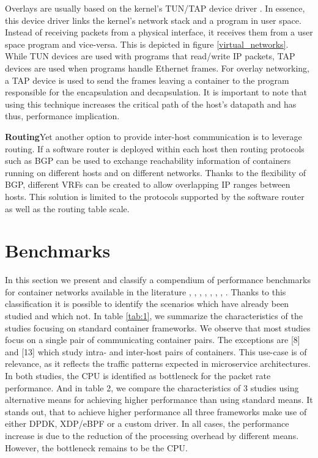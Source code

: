 \documentclass[conference]{IEEEtran}
\begin{document}
Overlays are usually based on the kernel's TUN/TAP device driver \cite{tuntap}. In essence, this device driver links the kernel's network stack and a program in user space. Instead of receiving packets from a physical interface, it receives them from a user space program and vice-versa. This is depicted in figure \ref{virtual_networks}. While TUN devices are used with programs that read/write IP packets, TAP devices are used when programs handle Ethernet frames. For overlay networking, a TAP device is used to send the frames leaving a container to the program responsible for the encapsulation and decapsulation. It is important to note that using this technique increases the critical path of the host's datapath and has thus, performance implication.

\noindent\textbf{Routing}\hspace{0.2cm}Yet another option to provide inter-host communication is to leverage routing. If a software router is deployed within each host then routing protocols such as BGP can be used to exchange reachability information of containers running on different hosts and on different networks. Thanks to the flexibility of BGP, different VRFs can be created to allow overlapping IP ranges between hosts. This solution is limited to the protocols supported by the software router as well as the routing table scale.

\section{Benchmarks}
In this section we present and classify a compendium of performance benchmarks for container networks available in the literature 
\cite{IEEE_INFOCOM_2018:K. Suo}, \cite{HotConNet_17:Zhao}, \cite{Nakamura:2018}, \cite{Boeira:2021}, \cite{Bankston:2018}, \cite{CoNEXT:2018}, \cite{ICTC_2018:Park}, \cite{NOMS_2016:Claassen}. Thanks to this classification it is possible to identify the scenarios which have already been studied and which not. In table \ref{tab:1}, we summarize the characteristics of the studies focusing on standard container frameworks. We observe that most studies focus on a single pair of communicating container pairs. The exceptions are [8] and [13] which study intra- and inter-host pairs of containers. This use-case is of relevance, as it reflects the traffic patterns expected in microservice architectures. In both studies, the CPU is identified as bottleneck for the packet rate performance. And in table 2, we compare the characteristics of 3 studies using alternative means for achieving higher performance than using standard means. It stands out, that to achieve higher performance all three frameworks make use of either DPDK, XDP/eBPF or a custom driver.  In all cases, the performance increase is due to the reduction of the processing overhead by different means. However, the bottleneck remains to be the CPU.
\end{document}

